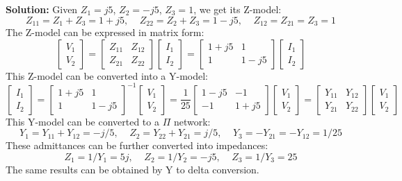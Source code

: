 \begin{itemize}
{\bf Solution:} Given $Z_1=j5$, $Z_2=-j5$, $Z_3=1$, we get its Z-model:
\[  Z_{11}=Z_1+Z_3=1+j5,\;\;\;\;Z_{22}=Z_2+Z_3=1-j5,\;\;\;\;Z_{12}=Z_{21}=Z_3=1 \]
The Z-model can be expressed in matrix form:
\[	\left[ \begin{array}{l} V_1 \\ V_2\end{array} \right]=
	\left[ \begin{array}{cc} Z_{11} & Z_{12} \\ Z_{21} & Z_{22} \end{array} \right]
	\left[ \begin{array}{l} I_1 \\ I_2\end{array} \right]
=	\left[ \begin{array}{cc} 1+j5 & 1 \\ 1 & 1-j5 \end{array} \right]
	\left[ \begin{array}{l} I_1 \\ I_2\end{array} \right]
\]
This Z-model can be converted into a Y-model:
\[	\left[ \begin{array}{l} I_1 \\ I_2\end{array} \right]=
	\left[ \begin{array}{cc} 1+j5 & 1 \\ 1 & 1-j5 \end{array} \right]^{-1}
	\left[ \begin{array}{l} V_1 \\ V_2\end{array} \right]
=\frac{1}{25}
	\left[ \begin{array}{cc} 1-j5 & -1 \\ -1 & 1+j5 \end{array} \right]
	\left[ \begin{array}{l} V_1 \\ V_2\end{array} \right]
=	\left[ \begin{array}{cc} Y_{11} & Y_{12} \\ Y_{21} & Y_{22} \end{array} \right]
	\left[ \begin{array}{l} V_1 \\ V_2\end{array} \right]
\]
This Y-model can be converted to a $\Pi$ network:
\[ Y_1=Y_{11}+Y_{12}=-j/5,\;\;\;\;Z_2=Y_{22}+Y_{21}=j/5,\;\;\;\;
	Y_3=-Y_{21}=-Y_{12}=1/25 \]
These admittances can be further converted into impedances:
\[ Z_1=1/Y_1=5j,\;\;\;\;Z_2=1/Y_2=-j5,\;\;\;\;Z_3=1/Y_3=25	\]
The same results can be obtained by Y to delta conversion.



\end{itemize}
